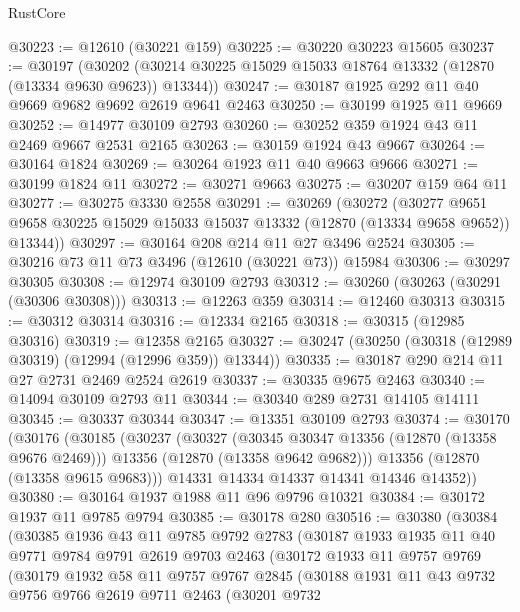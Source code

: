 \begin{lexlean}{RustCore}
\begin{coremodule}
@30223 := @12610 (@30221 @159)
@30225 := @30220 @30223 @15605
@30237 := @30197
    (@30202 (@30214 @30225 @15029 @15033 @18764 @13332 (@12870 (@13334 @9630 @9623)) @13344))
@30247 := @30187 @1925 @292 @11 @40 @9669 @9682 @9692 @2619 @9641 @2463
@30250 := @30199 @1925 @11 @9669
@30252 := @14977 @30109 @2793
@30260 := @30252 @359 @1924 @43 @11 @2469 @9667 @2531 @2165
@30263 := @30159 @1924 @43 @9667
@30264 := @30164 @1824
@30269 := @30264 @1923 @11 @40 @9663 @9666
@30271 := @30199 @1824 @11
@30272 := @30271 @9663
@30275 := @30207 @159 @64 @11
@30277 := @30275 @3330 @2558
@30291 := @30269
    (@30272
      (@30277 @9651 @9658 @30225 @15029 @15033 @15037 @13332 (@12870 (@13334 @9658 @9652)) @13344))
@30297 := @30164 @208 @214 @11 @27 @3496 @2524
@30305 := @30216 @73 @11 @73 @3496 (@12610 (@30221 @73)) @15984
@30306 := @30297 @30305
@30308 := @12974 @30109 @2793
@30312 := @30260 (@30263 (@30291 (@30306 @30308)))
@30313 := @12263 @359
@30314 := @12460 @30313
@30315 := @30312 @30314
@30316 := @12334 @2165
@30318 := @30315 (@12985 @30316)
@30319 := @12358 @2165
@30327 := @30247 (@30250 (@30318 (@12989 @30319) (@12994 (@12996 @359)) @13344))
@30335 := @30187 @290 @214 @11 @27 @2731 @2469 @2524 @2619
@30337 := @30335 @9675 @2463
@30340 := @14094 @30109 @2793 @11
@30344 := @30340 @289 @2731 @14105 @14111
@30345 := @30337 @30344
@30347 := @13351 @30109 @2793
@30374 := @30170
    (@30176
      (@30185
        (@30237
          (@30327
            (@30345 @30347 @13356 (@12870 (@13358 @9676 @2469)))
            @13356
            (@12870 (@13358 @9642 @9682)))
          @13356
          (@12870 (@13358 @9615 @9683)))
        @14331
        @14334
        @14337
        @14341
        @14346
        @14352))
@30380 := @30164 @1937 @1988 @11 @96 @9796 @10321
@30384 := @30172 @1937 @11 @9785 @9794
@30385 := @30178 @280
@30516 := @30380
    (@30384
      (@30385
        @1936
        @43
        @11
        @9785
        @9792
        @2783
        (@30187
          @1933
          @1935
          @11
          @40
          @9771
          @9784
          @9791
          @2619
          @9703
          @2463
          (@30172
            @1933
            @11
            @9757
            @9769
            (@30179
              @1932
              @58
              @11
              @9757
              @9767
              @2845
              (@30188
                @1931
                @11
                @43
                @9732
                @9756
                @9766
                @2619
                @9711
                @2463
                (@30201
                  @9732

\end{coremodule}
\end{lexlean}
